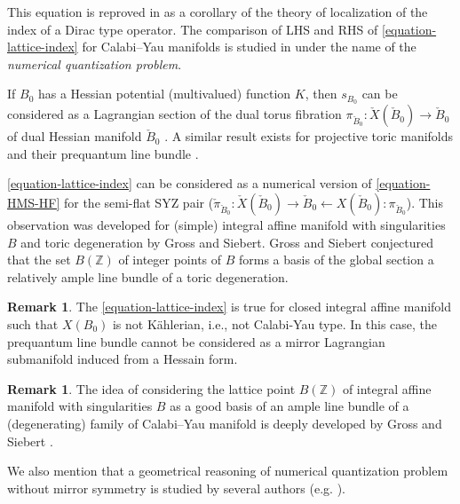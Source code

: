 \documentclass[a4paper,dvipdfmx,reqno,12pt]{amsart}
\theoremstyle{definition}
\newtheorem{remark}[theorem]{Remark}
\numberwithin{equation}{section}
\begin{document}
This equation is reproved in \cite{MR2676658} as a 
corollary of the theory of localization of the 
index of a Dirac type operator.
The comparison of LHS and RHS of 
\cref{equation-lattice-index} for
Calabi--Yau manifolds is studied in 
\cite{1999math......2027T} under 
the name of the \emph{numerical quantization problem}.

If $B_0$ has a Hessian potential (multivalued) function $K$, then $s_{B_0}$ can be 
considered as a Lagrangian section of the dual torus 
fibration $\pi_{\check{B}_0}\colon 
\check{X}(\check{B}_0)\to \check{B}_0$ of dual Hessian
manifold $\check{B}_0$ \cite[Proposition 6.9]{MR2567952}.
A similar result exists for projective toric manifolds 
and their prequantum line bundle 
\cite[Theorem 3.20]{yamaguchimaster}. 

\cref{equation-lattice-index} can be considered
as a numerical version of \cref{equation-HMS-HF}
for the semi-flat SYZ pair 
($\check{\pi}_{\check{B}_0}\colon \check{X}(\check{B}_0)
\to \check{B}_0 \leftarrow X(\check{B}_0)\colon \pi_{\check{B}_0}$). 
This observation was developed for 
(simple) integral affine manifold with singularities
$B$
and toric degeneration by Gross and Siebert. 
Gross and Siebert conjectured 
that the set $B(\mathbb{Z})$ of integer points of 
$B$ forms a basis of the global section a 
relatively ample line bundle of a toric degeneration.


\begin{remark}
The \cref{equation-lattice-index} is 
true for closed integral affine manifold 
such that $X(B_0)$ is not K\"ahlerian, i.e., 
not Calabi-Yau type.
In this case,
the prequantum line bundle cannot be considered as
a mirror Lagrangian submanifold induced from a Hessain
form.
\end{remark}



\begin{remark}

The idea of considering the lattice point 
$B(\mathbb{Z})$ of 
integral affine manifold with singularities $B$ as 
a good basis of an ample line bundle of 
a (degenerating) family of Calabi--Yau manifold is 
deeply developed by Gross and Siebert 
\cite[Conjecture 1.6]{MR3525095}. 




We also mention that a geometrical reasoning 
of numerical quantization problem without
mirror symmetry is studied by several authors 
(e.g. \cite{MR2879247,
https://doi.org/10.48550/arxiv.1904.04076}).
\end{remark}
\end{document}
